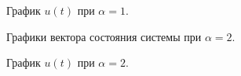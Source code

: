 \begin{figure}[!h]
	\caption{График $u(t)$ при $\alpha = 1$.}
	\label{4_2_u_1}
\end{figure}


\begin{figure}[!h]
	\caption{Графики вектора состояния системы при $\alpha = 2$.}
	\label{4_2_x_2}
\end{figure}

\begin{figure}[!h]
	\caption{График $u(t)$ при $\alpha = 2$.}
	\label{4_2_u_2}
\end{figure}




